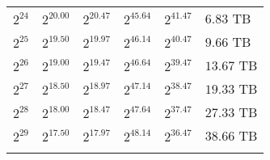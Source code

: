 \begin{tabular}{llllll}
$2^{24}$ & $2^{20.00}$ & $2^{20.47}$ & $2^{45.64}$ & $2^{41.47}$ & $6.83$ TB \\
$2^{25}$ & $2^{19.50}$ & $2^{19.97}$ & $2^{46.14}$ & $2^{40.47}$ & $9.66$ TB \\
$2^{26}$ & $2^{19.00}$ & $2^{19.47}$ & $2^{46.64}$ & $2^{39.47}$ & $13.67$ TB \\
$2^{27}$ & $2^{18.50}$ & $2^{18.97}$ & $2^{47.14}$ & $2^{38.47}$ & $19.33$ TB \\
$2^{28}$ & $2^{18.00}$ & $2^{18.47}$ & $2^{47.64}$ & $2^{37.47}$ & $27.33$ TB \\
$2^{29}$ & $2^{17.50}$ & $2^{17.97}$ & $2^{48.14}$ & $2^{36.47}$ & $38.66$ TB \\
 &  &  &  &  &  \\
\end{tabular}